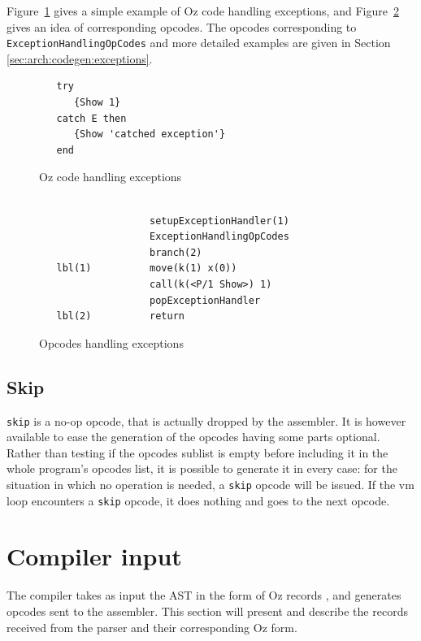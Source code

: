 \documentclass[a4paper]{memoir}
\begin{document}
Figure~\ref{fig:opcodes:exception:oz} gives a simple example of Oz code
handling exceptions, and Figure~\ref{fig:opcodes:exception:result} gives an
idea of corresponding opcodes. The opcodes corresponding to
\lstinline!ExceptionHandlingOpCodes! and more detailed examples are given in
Section \ref{sec:arch:codegen:exceptions}.
\begin{figure}[ht]
\begin{lstlisting}
   try
      {Show 1}
   catch E then
      {Show 'catched exception'}
   end
\end{lstlisting}
\caption{Oz code handling exceptions}
\label{fig:opcodes:exception:oz}
\end{figure}



\begin{figure}[ht]
\begin{lstlisting}
    
                   setupExceptionHandler(1)
                   ExceptionHandlingOpCodes
                   branch(2)
   lbl(1)          move(k(1) x(0))
                   call(k(<P/1 Show>) 1)
                   popExceptionHandler
   lbl(2)          return
\end{lstlisting}
\caption{Opcodes handling exceptions}
\label{fig:opcodes:exception:result}
\end{figure}


\subsection{Skip}
\lstinline!skip! is a no-op opcode, that is actually dropped by the assembler.
It is however available to ease the generation of the opcodes having some parts
optional. Rather than testing if the opcodes sublist is empty before including
it in the whole program's opcodes list, it is possible to generate it in every
case: for the situation in which no operation is needed, a \lstinline!skip! opcode will be
issued.
If the vm loop encounters a \lstinline!skip! opcode, it does nothing and goes to the next opcode.






\section{Compiler input}\label{section:compilerinput}
The compiler takes as input the AST in the form of Oz records \cite{AST}, and generates opcodes sent to the assembler. 
This section will present and describe the records received from the parser and
their corresponding Oz form.
\end{document}
